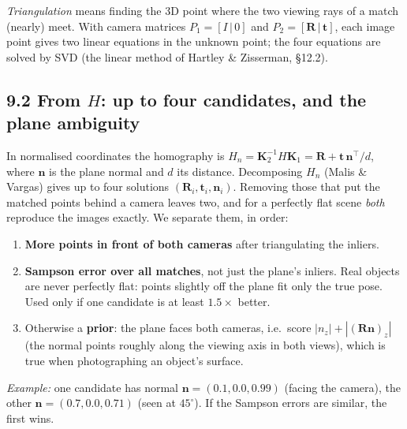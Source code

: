 \documentclass[11pt,a4paper]{article}
\newcommand{\R}{\mathbf{R}}
\newcommand{\tv}{\mathbf{t}}
\newcommand{\n}{\mathbf{n}}
\newcommand{\K}{\mathbf{K}}
\begin{document}
\emph{Triangulation} means finding the 3D point where the two viewing rays of a match (nearly) meet. With camera matrices $P_1=[I\,|\,0]$ and $P_2=[\R\,|\,\tv]$, each image point gives two linear equations in the unknown point; the four equations are solved by SVD (the linear method of Hartley \& Zisserman, \S12.2).

\subsection*{9.2 From $H$: up to four candidates, and the plane ambiguity}
In normalised coordinates the homography is $H_n = \K_2^{-1} H \K_1 = \R + \tv\,\n^\top/d$, where $\n$ is the plane normal and $d$ its distance. Decomposing $H_n$ (Malis \& Vargas) gives up to four solutions $(\R_i,\tv_i,\n_i)$. Removing those that put the matched points behind a camera leaves two, and for a perfectly flat scene \emph{both} reproduce the images exactly. We separate them, in order:
\begin{enumerate}
  \item \textbf{More points in front of both cameras} after triangulating the inliers.
  \item \textbf{Sampson error over all matches}, not just the plane's inliers. Real objects are never perfectly flat: points slightly off the plane fit only the true pose. Used only if one candidate is at least $1.5\times$ better.
  \item Otherwise a \textbf{prior}: the plane faces both cameras, i.e.\ score $|n_z| + |(\R\n)_z|$ (the normal points roughly along the viewing axis in both views), which is true when photographing an object's surface.
\end{enumerate}
\emph{Example:} one candidate has normal $\n=(0.1,0.0,0.99)$ (facing the camera), the other $\n=(0.7,0.0,0.71)$ (seen at $45^\circ$). If the Sampson errors are similar, the first wins.
\end{document}
